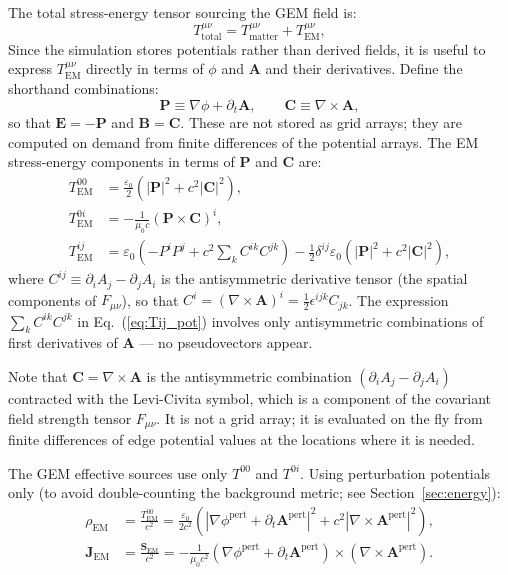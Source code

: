 \documentclass[11pt,a4paper]{article}
\newcommand{\vv}[1]{\mathbf{#1}}
\begin{document}
The total stress-energy tensor sourcing the GEM field is:
\begin{equation}
  T^{\mu\nu}_{\mathrm{total}} = T^{\mu\nu}_{\mathrm{matter}} + T^{\mu\nu}_{\mathrm{EM}},
\end{equation}
Since the simulation stores potentials rather than derived fields, it is useful to express $T^{\mu\nu}_{\mathrm{EM}}$ directly in terms of $\phi$ and $\vv{A}$ and their derivatives.  Define the shorthand combinations:
\begin{equation}
  \vv{P} \equiv \nabla\phi + \partial_t\vv{A}, \qquad
  \vv{C} \equiv \nabla\times\vv{A},
\end{equation}
so that $\vv{E} = -\vv{P}$ and $\vv{B} = \vv{C}$.  These are not stored as grid arrays; they are computed on demand from finite differences of the potential arrays.  The EM stress-energy components in terms of $\vv{P}$ and $\vv{C}$ are:
\begin{align}
  T^{00}_{\mathrm{EM}} &= \frac{\varepsilon_0}{2}\!\left(|\vv{P}|^2 + c^2|\vv{C}|^2\right), \label{eq:T00_pot}\\
  T^{0i}_{\mathrm{EM}} &= -\frac{1}{\mu_0 c}\!\left(\vv{P}\times\vv{C}\right)^i, \label{eq:T0i_pot}\\
  T^{ij}_{\mathrm{EM}} &= \varepsilon_0\!\left(-P^i P^j + c^2\sum_k C^{ik}C^{jk}\right) - \tfrac{1}{2}\delta^{ij}\varepsilon_0\!\left(|\vv{P}|^2+c^2|\vv{C}|^2\right), \label{eq:Tij_pot}
\end{align}
where $C^{ij} \equiv \partial_i A_j - \partial_j A_i$ is the antisymmetric derivative tensor (the spatial components of $F_{\mu\nu}$), so that $C^i = (\nabla\times\vv{A})^i = \tfrac{1}{2}\epsilon^{ijk}C_{jk}$.  The expression $\sum_k C^{ik}C^{jk}$ in Eq.~(\ref{eq:Tij_pot}) involves only antisymmetric combinations of first derivatives of $\vv{A}$ --- no pseudovectors appear.

Note that $\vv{C} = \nabla\times\vv{A}$ is the antisymmetric combination $(\partial_i A_j - \partial_j A_i)$ contracted with the Levi-Civita symbol, which is a component of the covariant field strength tensor $F_{\mu\nu}$.  It is not a grid array; it is evaluated on the fly from finite differences of edge potential values at the locations where it is needed.

The GEM effective sources use only $T^{00}$ and $T^{0i}$.  Using perturbation potentials only (to avoid double-counting the background metric; see Section~\ref{sec:energy}):
\begin{align}
  \rho_{\mathrm{EM}} &= \frac{T^{00}_{\mathrm{EM}}}{c^2}
    = \frac{\varepsilon_0}{2c^2}\!\left(|\nabla\phi^{\mathrm{pert}} + \partial_t\vv{A}^{\mathrm{pert}}|^2
      + c^2|\nabla\times\vv{A}^{\mathrm{pert}}|^2\right), \label{eq:rho_em_pot}\\
  \vv{J}_{\mathrm{EM}} &= \frac{\vv{S}_{\mathrm{EM}}}{c^2}
    = -\frac{1}{\mu_0 c^2}\!\left(\nabla\phi^{\mathrm{pert}} + \partial_t\vv{A}^{\mathrm{pert}}\right)
      \times\!\left(\nabla\times\vv{A}^{\mathrm{pert}}\right). \label{eq:J_em_pot}
\end{align}
\end{document}
